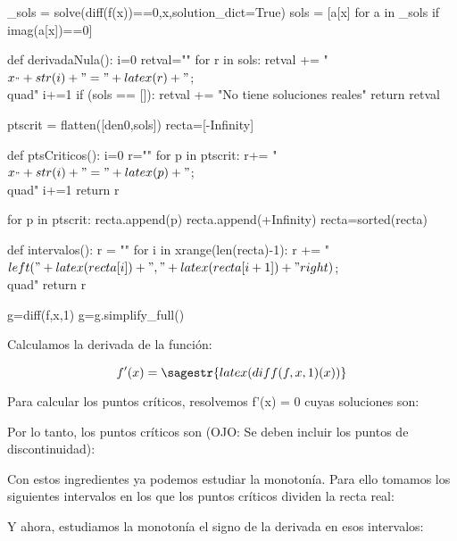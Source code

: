 \begin{sagesilent}

_sols = solve(diff(f(x))==0,x,solution_dict=True)
sols = [a[x] for a in _sols if imag(a[x])==0]

def derivadaNula():
    i=0
    retval=""
    for r in sols:
        retval += "$x_"+str(i)+" = "+latex(r)+"$;\\quad"
        i+=1
    if (sols == []):
        retval += "No tiene soluciones reales"
    return retval

ptscrit = flatten([den0,sols])
recta=[-Infinity]

def ptsCriticos():
    i=0
    r=""
    for p in ptscrit:
        r+= "$x_"+str(i)+"="+latex(p)+"$;\\quad"
        i+=1
    return r

for p in ptscrit:
     recta.append(p)
recta.append(+Infinity)
recta=sorted(recta)

def intervalos():
    r = ""
    for i in xrange(len(recta)-1):
        r += "$\\left("+latex(recta[i])+","+latex(recta[i+1])+"\\right)$;\\quad"  
    return r

g=diff(f,x,1)
g=g.simplify_full()
\end{sagesilent}

Calculamos la derivada de la función:

\[f'(x) = \sagestr{latex(diff(f,x,1)(x))} \]%

Para calcular los puntos críticos, resolvemos f'(x) = 0 cuyas soluciones son: 

Por lo tanto, los puntos críticos son (OJO: Se deben incluir los puntos de discontinuidad): 


Con estos ingredientes ya podemos estudiar la monotonía. Para ello tomamos los siguientes intervalos en los que los puntos críticos dividen la recta real:


Y ahora, estudiamos la monotonía el signo de la derivada en esos intervalos:
   
